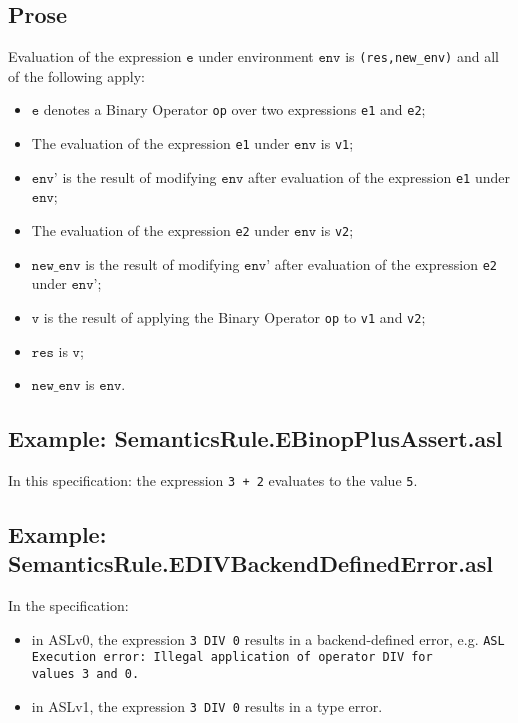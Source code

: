 \documentclass{book}
\newcommand\newenv[0]{\texttt{new\_env}}
\newcommand\env[0]{\texttt{env}}
\newcommand\envp[0]{\texttt{env'}}
\newcommand\ve[0]{\texttt{e}}
\newcommand\vv[0]{\texttt{v}}
\newcommand\vres[0]{\texttt{res}}
\begin{document}
  \subsection{Prose}
  Evaluation of the expression $\ve$ under environment $\env$ is \texttt{(res,new\_env)} and all of the following apply:
  \begin{itemize}
    \item $\ve$ denotes a Binary Operator \texttt{op} over two expressions \texttt{e1} and \texttt{e2};
    \item The evaluation of the expression \texttt{e1} under $\env$ is \texttt{v1};
    \item $\envp$ is the result of modifying $\env$ after evaluation of the expression \texttt{e1} under $\env$;
    \item The evaluation of the expression \texttt{e2} under $\env$ is \texttt{v2};
    \item $\newenv$ is the result of modifying $\envp$ after evaluation of the expression \texttt{e2} under $\envp$;
    \item $\vv$ is the result of applying the Binary Operator \texttt{op} to \texttt{v1} and \texttt{v2};
    \item $\vres$ is $\vv$;
    \item $\newenv$ is $\env$.
  \end{itemize}

  \subsection{Example: SemanticsRule.EBinopPlusAssert.asl}
    In this specification:
    the expression \texttt{3 + 2} evaluates to the value \texttt{5}.

  \subsection{Example: \\ SemanticsRule.EDIVBackendDefinedError.asl}
    In the specification:
    \begin{itemize}
    \item in ASLv0, the expression \texttt{3 DIV 0} results in a backend-defined
      error, e.g.
      \texttt{ASL Execution error: Illegal application of operator DIV for \\ values 3 and 0.}
    \item in ASLv1, the expression \texttt{3 DIV 0} results in a type error.
    \end{itemize}
\end{document}
